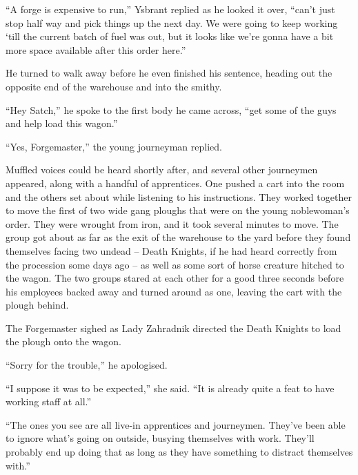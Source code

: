  

“A forge is expensive to run,” Ysbrant replied as he looked it over, “can’t just stop half way and pick things up the next day. We were going to keep working ‘till the current batch of fuel was out, but it looks like we’re gonna have a bit more space available after this order here.”

 

He turned to walk away before he even finished his sentence, heading out the opposite end of the warehouse and into the smithy.

 

“Hey Satch,” he spoke to the first body he came across, “get some of the guys and help load this wagon.”

 

“Yes, Forgemaster,” the young journeyman replied.

 

Muffled voices could be heard shortly after, and several other journeymen appeared, along with a handful of apprentices. One pushed a cart into the room and the others set about while listening to his instructions. They worked together to move the first of two wide gang ploughs that were on the young noblewoman’s order. They were wrought from iron, and it took several minutes to move. The group got about as far as the exit of the warehouse to the yard before they found themselves facing two undead – Death Knights, if he had heard correctly from the procession some days ago – as well as some sort of horse creature hitched to the wagon. The two groups stared at each other for a good three seconds before his employees backed away and turned around as one, leaving the cart with the plough behind.

 

The Forgemaster sighed as Lady Zahradnik directed the Death Knights to load the plough onto the wagon.

 

“Sorry for the trouble,” he apologised.

 

“I suppose it was to be expected,” she said. “It is already quite a feat to have working staff at all.”

 

“The ones you see are all live-in apprentices and journeymen. They’ve been able to ignore what’s going on outside, busying themselves with work. They’ll probably end up doing that as long as they have something to distract themselves with.”

